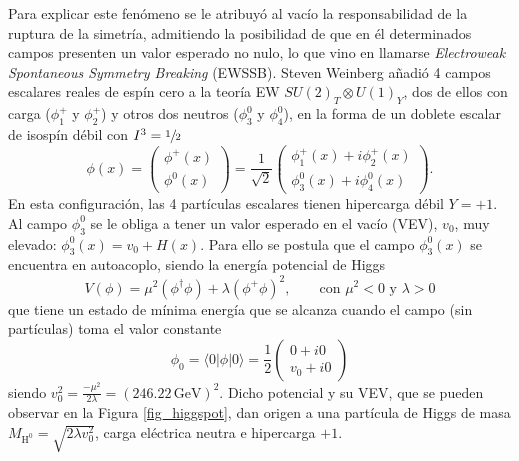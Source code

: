 Para explicar este fenómeno se le atribuyó al vacío la
responsabilidad de la ruptura de la simetría, admitiendo la posibilidad de que en él determinados
campos presenten un valor esperado no nulo, lo que vino en llamarse \textit{Electroweak Spontaneous Symmetry Breaking} (EWSSB). Steven Weinberg añadió 4 campos escalares reales de espín cero a la teoría EW $SU(2)_T \otimes U(1)_Y$, dos de ellos con carga ($\phi_1^+$ y $\phi_2^+$) y otros dos neutros ($\phi_3^0$ y $\phi_4^0$), en la forma de un doblete escalar de isospín débil con $I^3 = \sfrac{1}{2}$
\begin{equation}
  \phi(x) = \begin{pmatrix}
    \phi^+(x) \\ \phi^0 (x) 
  \end{pmatrix} = \frac{1}{\sqrt{2}} \begin{pmatrix}
    \phi_1^+(x) + i\phi_2^+(x) \\ \phi_3^0(x) + i\phi_4^0(x) 
  \end{pmatrix}.
\end{equation}
En esta configuración, las 4 partículas escalares tienen hipercarga
débil $Y = +1$. Al campo $\phi_3^0$
se le obliga a tener un valor esperado en el vacío (VEV), $v_0$, muy
elevado: $\phi_3^0(x) = v_0+ H(x)$.
Para ello se postula que el campo $\phi_3^0 (x)$ se encuentra en autoacoplo, siendo la energía potencial de Higgs 
\begin{equation}
V(\phi) = \mu^2 (\phi^{\dagger} \phi) + \lambda (\phi^+ \phi)^2,  \qquad \text{con } \mu^2<0 \text{ y } \lambda >0
\end{equation}
que tiene un estado de mínima energía que se alcanza cuando el campo (sin partículas) toma el valor constante
\[\phi_0 = \langle 0 | \phi | 0 \rangle = \frac{1}{2} \begin{pmatrix}
  0+i0\\ v_0+ i0
\end{pmatrix}\]
siendo $v_0^2 = \frac{-\mu^2}{2 \lambda} = (246.22 \, \mathrm{GeV})^2$. Dicho potencial y su VEV, que se pueden observar en la Figura \ref{fig_higgspot}, dan origen a una partícula de Higgs de masa $M_{\mathrm{H^0}} = \sqrt{2 \lambda v_0^2}$, carga eléctrica neutra e hipercarga $+1$.  

